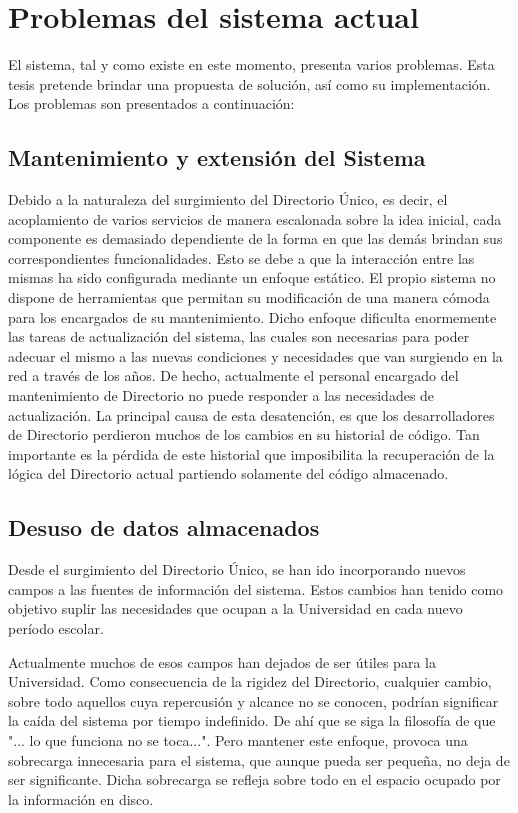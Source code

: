 \section{Problemas del sistema actual}

El sistema, tal y como existe en este momento, presenta varios problemas. Esta tesis 
pretende brindar una propuesta de solución, así como su implementación. Los problemas son 
presentados a continuación:

\subsection{Mantenimiento y extensión del Sistema}

Debido a la naturaleza del surgimiento del Directorio Único, es decir, el acoplamiento 
de varios servicios de manera escalonada sobre la idea inicial, cada componente es 
demasiado dependiente de la forma en que las demás brindan sus correspondientes 
funcionalidades. Esto se debe a que la interacción entre las mismas ha sido configurada 
mediante un enfoque estático. El propio sistema no dispone de herramientas que permitan su 
modificación de una manera cómoda para los encargados de su mantenimiento. Dicho enfoque 
dificulta enormemente las tareas de actualización del sistema, las cuales son necesarias 
para poder adecuar el mismo a las nuevas condiciones y necesidades que van surgiendo en la 
red a través de los años. De hecho, actualmente el personal encargado del mantenimiento de
Directorio no puede responder a las necesidades de actualización. La principal causa de 
esta desatención, es que los desarrolladores de Directorio perdieron muchos de los cambios
en su historial de código. Tan importante es la pérdida de este historial que imposibilita
la recuperación de la lógica del Directorio actual partiendo solamente del código almacenado.

\subsection{Desuso de datos almacenados}

Desde el surgimiento del Directorio Único, se han ido incorporando nuevos campos a las 
fuentes de información del sistema. Estos cambios han tenido como objetivo suplir las 
necesidades que ocupan a la Universidad en cada nuevo período escolar. 

Actualmente muchos de esos campos han dejados de ser útiles para la Universidad. Como
consecuencia de la rigidez del Directorio, cualquier cambio, sobre todo aquellos cuya 
repercusión y alcance no se conocen, podrían significar la caída del sistema por tiempo 
indefinido. De ahí que se siga la filosofía de que "... lo que funciona no se toca...". Pero
mantener este enfoque, provoca una sobrecarga innecesaria para el sistema, que aunque pueda
ser pequeña, no deja de ser significante. Dicha sobrecarga se refleja sobre todo en el 
espacio ocupado por la información en disco.

